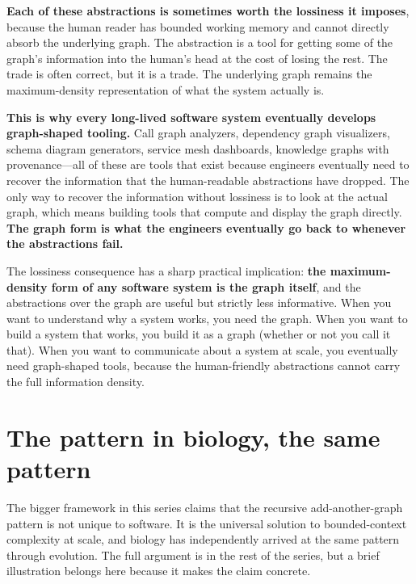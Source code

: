 \documentclass[11pt]{article}
\begin{document}
\textbf{Each of these abstractions is sometimes worth the lossiness it imposes}, because the human reader has bounded working memory and cannot directly absorb the underlying graph. The abstraction is a tool for getting some of the graph's information into the human's head at the cost of losing the rest. The trade is often correct, but it is a trade. The underlying graph remains the maximum-density representation of what the system actually is.

\textbf{This is why every long-lived software system eventually develops graph-shaped tooling.} Call graph analyzers, dependency graph visualizers, schema diagram generators, service mesh dashboards, knowledge graphs with provenance---all of these are tools that exist because engineers eventually need to recover the information that the human-readable abstractions have dropped. The only way to recover the information without lossiness is to look at the actual graph, which means building tools that compute and display the graph directly. \textbf{The graph form is what the engineers eventually go back to whenever the abstractions fail.}

The lossiness consequence has a sharp practical implication: \textbf{the maximum-density form of any software system is the graph itself}, and the abstractions over the graph are useful but strictly less informative. When you want to understand why a system works, you need the graph. When you want to build a system that works, you build it as a graph (whether or not you call it that). When you want to communicate about a system at scale, you eventually need graph-shaped tools, because the human-friendly abstractions cannot carry the full information density.

\section{The pattern in biology, the same pattern}
\label{sec:biology}

The bigger framework in this series claims that the recursive add-another-graph pattern is not unique to software. It is the universal solution to bounded-context complexity at scale, and biology has independently arrived at the same pattern through evolution. The full argument is in the rest of the series, but a brief illustration belongs here because it makes the claim concrete.
\end{document}
